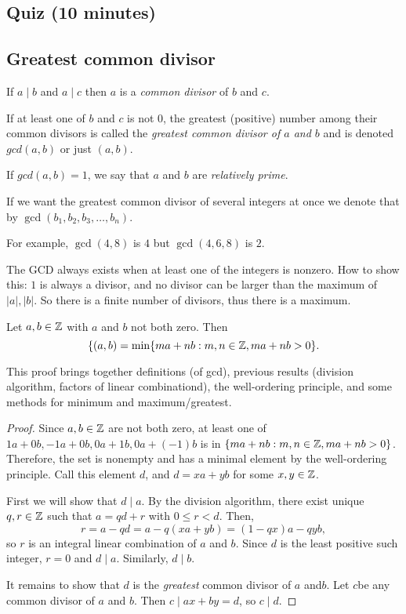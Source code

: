 \documentclass{ximera}
\begin{document}
\subsection{Quiz (10 minutes)}
\subsection{Greatest common divisor} 

\begin{defn} If $a\mid b$ and $a\mid c$ then $a$ is a \emph{common divisor} of $b$ and $c$.

 If at least one of $b$ and $c$ is not $0$, the greatest (positive) number among their common divisors  is called the \emph{greatest common divisor of $a$ and $b$} and is denoted $gcd(a,b)$ or just $(a,b)$. 
 
 If $gcd(a,b)=1$, we say that $a$ and $b$ are \emph{relatively prime}.

If we want the greatest common divisor of several integers at once we denote that by $\gcd(b_1,b_2,b_3,\dots,b_n)$.
\end{defn}

For example, $\gcd(4,8)$ is $4$ but $\gcd(4,6,8)$ is $2$.

The GCD always exists when at least one of the integers is nonzero. How to show this: $1$ is always a divisor, and no divisor can be larger than the maximum of $|a|,|b|$. So there is a finite number of divisors, thus there is a maximum.


\begin{prop}\label{bezout-id}
 Let $a, b\in \mathbb Z$ with $a$ and $b$ not both zero. Then 
 \[\{(a,b)=\min\{ma+nb:m,n\in\mathbb Z, ma+nb>0\}.\]
\end{prop}
This proof brings together definitions (of gcd), previous results (division algorithm, factors of linear combinationd), the well-ordering principle, and some methods for minimum and maximum/greatest.
\begin{proof}
 Since $a,b\in\mathbb Z$ are not both zero, at least one of $1a+0b, -1a+0b, 0a+1b, 0a+(-1)b$ is in $\{ma+nb:m,n\in\mathbb Z, ma+nb>0\}$. Therefore, the set is nonempty and has a minimal element by the well-ordering principle. Call this element $d$, and $d=xa+yb$ for some $x,y\in \mathbb Z$.
 
First we will show that $d\mid a$. By the division algorithm, there exist unique $q,r\in\mathbb Z$ such that $a=qd+r$ with $0\leq r<d$. Then, \[r=a-qd=a-q(xa+yb)=(1-qx)a-qyb,\] so $r$ is an integral linear combination of $a$ and $b$.  Since $d$ is the least positive such integer, $r=0$ and $d\mid a$. Similarly, $d\mid b$. 

It remains to show that $d$ is the \emph{greatest} common divisor of $a$ and$b$. Let $c$be any common divisor of $a$  and $b$. Then $c\mid ax+by=d$, so $c\mid d$.
\end{proof}
\end{document}

